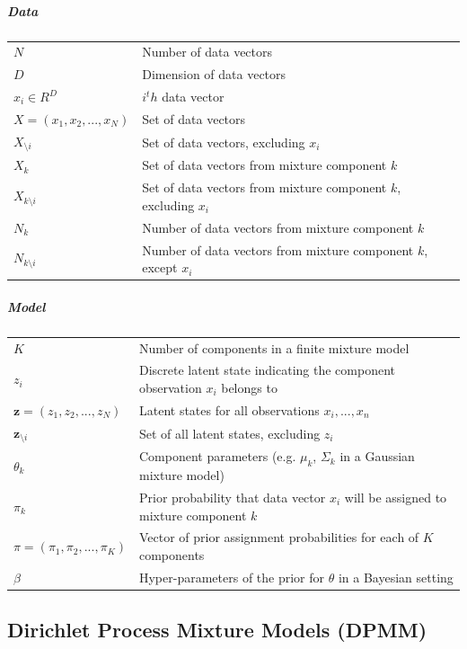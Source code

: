 \documentclass[12pt, a4paper]{article}
\begin{document}
\subparagraph{Data}
\begin{center}
\begin{tabular}{|l|l|}
\hline
$N$ & Number of data vectors \\
$D$ & Dimension of data vectors \\
$x_i \in R^D$ & $i^th$ data vector \\
$X = (x_1, x_2,...,x_N)$ & Set of data vectors \\
$X_{\setminus i}$ & Set of data vectors, excluding $x_i$\\
$X_k$  & Set of data vectors from mixture component $k$ \\ 
$X_{k \setminus i}$  & Set of data vectors from mixture component $k$, excluding $x_i$\\
$N_k$ & Number of data vectors from mixture component $k$ \\  
$N_{k \setminus i}$ & Number of data vectors from mixture component $k$, except $x_i$\\ \hline
\end{tabular}
\end{center}

\subparagraph{Model}
\begin{center}
\begin{tabular}{|l|l|} \hline
$K$ & Number of components in a finite mixture model \\
$z_i$ & Discrete latent state indicating the component observation $x_i$ belongs to \\
$\mathbf{z} = (z_1, z_2,...,z_N)$ & Latent states for all observations $x_i,..., x_n$\\
$\mathbf{z}_{\setminus i}$ & Set of all latent states, excluding $z_i$\\
$\theta_k$  & Component parameters (e.g. $\mu_k$, $\Sigma_k$ in a Gaussian mixture model)  \\
$\pi_k$ & Prior probability that data vector $x_i$ will be assigned to mixture component $k$ \\
$\pi = (\pi_1,\pi_2,...,\pi_K)$ & Vector of prior assignment probabilities for each of $K$ components \\
$\beta$ & Hyper-parameters of the prior for $\theta$ in a Bayesian setting \\ \hline
\end{tabular}
\end{center}


\subsection{Dirichlet Process Mixture Models (DPMM)}
\end{document}
